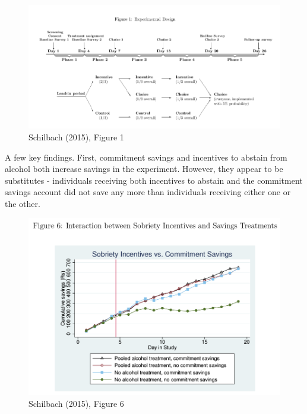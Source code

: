 \documentclass[12pt,english]{article}
\begin{document}
\begin{figure}[H]
	\begin{center}
		\begin{adjustbox}{
				max width=\textwidth,
			}
			\includegraphics{schilbachfig1.png}
		\end{adjustbox} \\
		Schilbach (2015), Figure 1
	\end{center}
\end{figure}

A few key findings. First, commitment savings and incentives to abstain from alcohol both increase savings in the experiment. However, they appear to be substitutes - individuals receiving both incentives to abstain and the commitment savings account did not save any more than individuals receiving either one or the other.

\begin{figure}[H]
	\begin{center}
		\begin{adjustbox}{
				max width=0.8\textwidth,
			}
			\includegraphics{schilbachfig6.png}
		\end{adjustbox} \\
		Schilbach (2015), Figure 6
	\end{center}
\end{figure}
\end{document}
